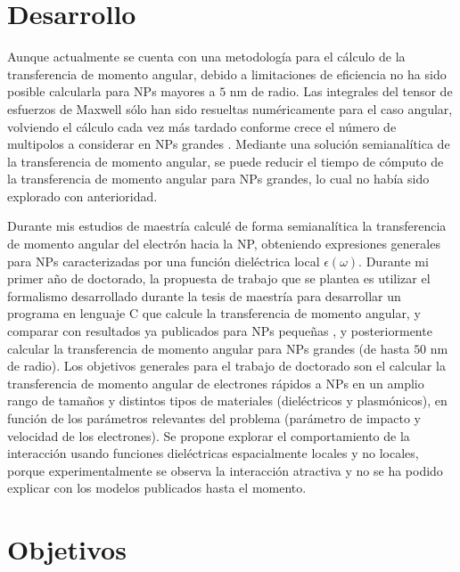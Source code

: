 \documentclass[letter,12pt]{article}
\numberwithin{equation}{section}
\begin{document}
\section{Desarrollo}

Aunque actualmente se cuenta con una metodología para el cálculo de la transferencia de momento angular, debido a limitaciones de eficiencia no ha sido posible calcularla para NPs mayores a $5$ nm de radio. Las integrales del tensor de esfuerzos de Maxwell sólo han sido resueltas numéricamente para el caso angular, volviendo el cálculo cada vez más tardado conforme crece el número de multipolos a considerar en NPs grandes \cite{castellanos2021phdthesis}. Mediante una solución semianalítica de la transferencia de momento angular, se puede reducir el tiempo de cómputo de la transferencia de momento angular para NPs grandes, lo cual no había sido explorado con anterioridad.

Durante mis estudios de maestría calculé de forma semianalítica la transferencia de momento angular del electrón hacia la NP, obteniendo expresiones generales para NPs caracterizadas por una función dieléctrica local $\epsilon (\omega)$. Durante mi primer año de doctorado, la propuesta de trabajo que se plantea es utilizar el formalismo desarrollado durante la tesis de maestría para desarrollar un programa en lenguaje C que calcule la transferencia de momento angular, y comparar con resultados ya publicados para NPs pequeñas \cite{castellanos2021angular}, y posteriormente calcular la transferencia de momento angular para NPs grandes (de hasta $50$ nm de radio). Los objetivos generales para el trabajo de doctorado son el calcular la transferencia de momento angular de electrones rápidos a NPs en un amplio rango de tamaños y distintos tipos de materiales (dieléctricos y plasmónicos), en función de los parámetros relevantes del problema (parámetro de impacto y velocidad de los electrones). Se propone explorar el comportamiento de la interacción usando funciones dieléctricas espacialmente locales y no locales, porque experimentalmente se observa la interacción atractiva y no se ha podido explicar con los modelos publicados hasta el momento.

\section{Objetivos}



 

\end{document}
